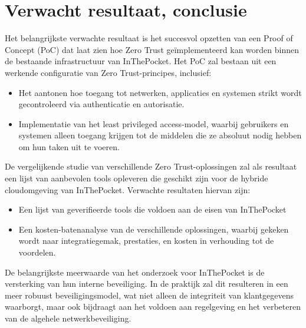 \section{Verwacht resultaat, conclusie}%
\label{sec:verwachte_resultaten}




Het belangrijkste verwachte resultaat is het succesvol opzetten van een Proof of Concept (PoC) dat laat zien hoe Zero Trust geïmplementeerd kan worden binnen de bestaande infrastructuur van InThePocket. Het PoC zal bestaan uit een werkende configuratie van Zero Trust-principes, inclusief:
\begin{itemize}
  \item Het aantonen hoe toegang tot netwerken, applicaties en systemen strikt wordt gecontroleerd via authenticatie en autorisatie.
  \item Implementatie van het least privileged access-model, waarbij gebruikers en systemen alleen toegang krijgen tot de middelen die ze absoluut nodig hebben om hun taken uit te voeren.
\end{itemize}
De vergelijkende studie van verschillende Zero Trust-oplossingen zal als resultaat een lijst van aanbevolen tools opleveren die geschikt zijn voor de hybride cloudomgeving van InThePocket.
Verwachte resultaten hiervan zijn:
\begin{itemize}
  \item Een lijst van geverifieerde tools die voldoen aan de eisen van InThePocket
  \item Een kosten-batenanalyse van de verschillende oplossingen, waarbij gekeken wordt naar integratiegemak, prestaties, en kosten in verhouding tot de voordelen.
\end{itemize}
De belangrijkste meerwaarde van het onderzoek voor InThePocket is de versterking van hun interne beveiliging. In de praktijk zal dit resulteren in een meer robuust beveiligingsmodel, wat niet alleen de integriteit van klantgegevens waarborgt, maar ook bijdraagt aan het voldoen aan regelgeving en het verbeteren van de algehele netwerkbeveiliging.